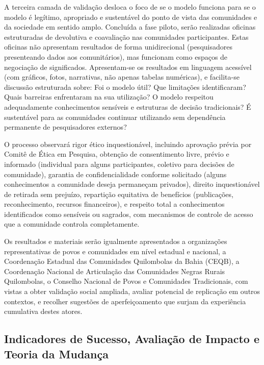 A terceira camada de validação desloca o foco de se o modelo funciona para se o modelo é legítimo, apropriado e sustentável do ponto de vista das comunidades e da sociedade em sentido amplo. Concluída a fase piloto, serão realizadas oficinas estruturadas de devolutiva e coavaliação nas comunidades participantes. Estas oficinas não apresentam resultados de forma unidirecional (pesquisadores presenteando dados aos comunitários), mas funcionam como espaços de negociação de significados. Apresentam-se os resultados em linguagem acessível (com gráficos, fotos, narrativas, não apenas tabelas numéricas), e facilita-se discussão estruturada sobre: Foi o modelo útil? Que limitações identificaram? Quais barreiras enfrentaram na sua utilização? O modelo respeitou adequadamente conhecimentos sensíveis e estruturas de decisão tradicionais? É sustentável para as comunidades continuar utilizando sem dependência permanente de pesquisadores externos?

O processo observará rigor ético inquestionável, incluindo aprovação prévia por Comitê de Ética em Pesquisa, obtenção de consentimento livre, prévio e informado (individual para alguns participantes, coletivo para decisões de comunidade), garantia de confidencialidade conforme solicitado (alguns conhecimentos a comunidade deseja permaneçam privados), direito inquestionável de retirada sem prejuízo, repartição equitativa de benefícios (publicações, reconhecimento, recursos financeiros), e respeito total a conhecimentos identificados como sensíveis ou sagrados, com mecanismos de controle de acesso que a comunidade controla completamente.

Os resultados e materiais serão igualmente apresentados a organizações representativas de povos e comunidades em nível estadual e nacional, a Coordenação Estadual das Comunidades Quilombolas da Bahia (CEQB), a Coordenação Nacional de Articulação das Comunidades Negras Rurais Quilombolas, o Conselho Nacional de Povos e Comunidades Tradicionais, com vistas a obter validação social ampliada, avaliar potencial de replicação em outros contextos, e recolher sugestões de aperfeiçoamento que surjam da experiência cumulativa destes atores.

\subsection{Indicadores de Sucesso, Avaliação de Impacto e Teoria da Mudança}

